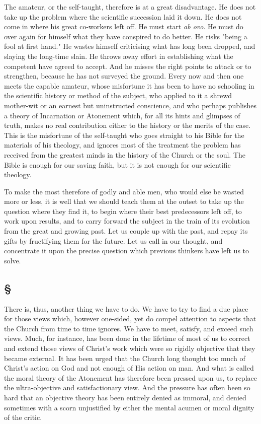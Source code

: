 \documentclass[draft]{ptfdoc}
\begin{document}
The amateur, or the self-taught, therefore is 
at a great disadvantage. He does not take up 
the problem where the scientific succession laid 
it down. He does not come in where his great 
co-workers left off. He must start \textit{ab ovo}. He 
must do over again for himself what they have 
conspired to do better. He risks "being a fool 
at first hand." He wastes himself criticising 
what has long been dropped, and slaying the 
long-time slain. He throws away effort in 
establishing what the competent have agreed 
to accept. And he misses the right points to 
attack or to strengthen, because he has not surveyed 
the ground. Every now and then one 
meets the capable amateur, whose misfortune 
it has been to have no schooling in the scientific 
history or method of the subject, who applied 
to it a shrewd mother-wit or an earnest but 
uninstructed conscience, and who perhaps publishes 
a theory of Incarnation or Atonement 
which, for all its hints and glimpses of truth, 
makes no real contribution either to the history 
or the merits of the case. This is the misfortune 
of the self-taught who goes straight 
to his Bible for the materials of his theology, 
and ignores most of the treatment the problem 
has received from the greatest minds in the 
history of the Church or the soul. The Bible 
is enough for our saving faith, but it is not 
enough for our scientific theology. 

To make the most therefore of godly and 
able men, who would else be wasted more or 
less, it is well that we should teach them at 
the outset to take up the question where they 
find it, to begin where their best predecessors 
left off, to work upon results, and to carry 
forward the subject in the train of its evolution 
from the great and growing past. Let us couple 
up with the past, and repay its gifts by fructifying 
them for the future. Let us call in our 
thought, and concentrate it upon the precise 
question which previous thinkers have left us 
to solve. 

\subsection*{
\S
}

There is, thus, another thing we have to do. 
We have to try to find a due place for those views 
which, however one-sided, yet do compel attention 
to aspects that the Church from time to time 
ignores. We have to meet, satisfy, and exceed 
such views. Much, for instance, has been done in 
the lifetime of most of us to correct and extend 
those views of Christ's work which were so 
rigidly objective that they became external. It 
has been urged that the Church long thought 
too much of Christ's action on God and not 
enough of His action on man. And what is 
called the moral theory of the Atonement has 
therefore been pressed upon us, to replace the 
ultra-objective and satisfactionary view. And 
the pressure has often been so hard that an objective 
theory has been entirely denied as immoral, 
and denied sometimes with a scorn unjustified 
by either the mental acumen or moral dignity 
of the critic. 
\end{document}
